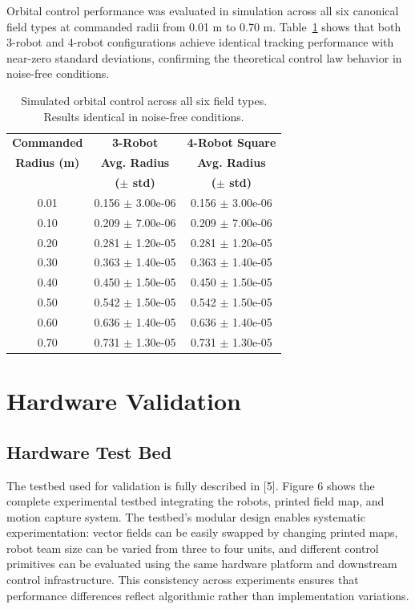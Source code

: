 \documentclass[lettersize,journal]{IEEEtran}
\begin{document}
Orbital control performance was evaluated in simulation across all six canonical field types at commanded radii from 0.01 m to 0.70 m. Table~\ref{tab:simulation_orbital_results} shows that both 3-robot and 4-robot configurations achieve identical tracking performance with near-zero standard deviations, confirming the theoretical control law behavior in noise-free conditions.

\begin{table}[!t]
    \centering
    \caption{Simulated orbital control across all six field types. Results identical in noise-free conditions.}
    \label{tab:simulation_orbital_results}
    \begin{tabular}{ccc}
    \hline
    \textbf{Commanded} & \textbf{3-Robot} & \textbf{4-Robot Square} \\
    \textbf{Radius (m)} & \textbf{Avg. Radius} & \textbf{Avg. Radius} \\
     & \textbf{($\pm$ std)} & \textbf{($\pm$ std)} \\
    \hline
    0.01 & 0.156 $\pm$ 3.00e-06 & 0.156 $\pm$ 3.00e-06 \\
    0.10 & 0.209 $\pm$ 7.00e-06 & 0.209 $\pm$ 7.00e-06 \\
    0.20 & 0.281 $\pm$ 1.20e-05 & 0.281 $\pm$ 1.20e-05 \\
    0.30 & 0.363 $\pm$ 1.40e-05 & 0.363 $\pm$ 1.40e-05 \\
    0.40 & 0.450 $\pm$ 1.50e-05 & 0.450 $\pm$ 1.50e-05 \\
    0.50 & 0.542 $\pm$ 1.50e-05 & 0.542 $\pm$ 1.50e-05 \\
    0.60 & 0.636 $\pm$ 1.40e-05 & 0.636 $\pm$ 1.40e-05 \\
    0.70 & 0.731 $\pm$ 1.30e-05 & 0.731 $\pm$ 1.30e-05 \\
    \hline
    \end{tabular}
    \end{table}


\section{Hardware Validation}


\subsection{Hardware Test Bed}

The testbed used for validation is fully described in [5]. Figure 6 shows the complete experimental testbed integrating the robots, printed field map, and motion capture system. The testbed's modular design enables systematic experimentation: vector fields can be easily swapped by changing printed maps, robot team size can be varied from three to four units, and different control primitives can be evaluated using the same hardware platform and downstream control infrastructure. This consistency across experiments ensures that performance differences reflect algorithmic rather than implementation variations.
\end{document}
